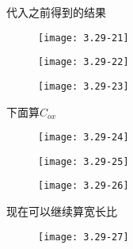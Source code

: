 代入之前得到的结果

		\begin{figure}[H] %
	\begin{minipage}{\linewidth}
		\texttt{[image: 3.29-21]}
	\end{minipage}
\end{figure}

		\begin{figure}[H] %
	\begin{minipage}{\linewidth}
		\texttt{[image: 3.29-22]}
	\end{minipage}
\end{figure}

		\begin{figure}[H] %
	\begin{minipage}{\linewidth}
		\texttt{[image: 3.29-23]}
	\end{minipage}
\end{figure}

下面算$C_{ox}$

		\begin{figure}[H] %
	\begin{minipage}{\linewidth}
		\texttt{[image: 3.29-24]}
	\end{minipage}
\end{figure}

		\begin{figure}[H] %
	\begin{minipage}{\linewidth}
		\texttt{[image: 3.29-25]}
	\end{minipage}
\end{figure}

		\begin{figure}[H] %
	\begin{minipage}{\linewidth}
		\texttt{[image: 3.29-26]}
	\end{minipage}
\end{figure}

现在可以继续算宽长比

		\begin{figure}[H] %
	\begin{minipage}{\linewidth}
		\texttt{[image: 3.29-27]}
	\end{minipage}
\end{figure}

